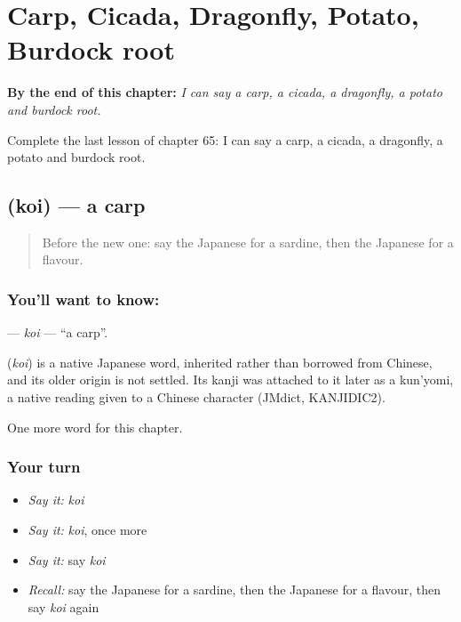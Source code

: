 
\chapter{Carp, Cicada, Dragonfly, Potato, Burdock root}
\label{ch:ja-carp-cicada-dragonfly-potato-burdock-root}

\begin{chapteropening}
\textbf{By the end of this chapter:} \emph{I can say a carp, a cicada, a dragonfly, a potato and burdock root.}

Complete the last lesson of chapter 65: I can say a carp, a cicada, a dragonfly, a potato and burdock root.
\end{chapteropening}

\section[\texorpdfstring{\ja{こい} (koi)}{こい (koi)}]{ (koi) — a carp}

\label{lesson:JA-C65-koi}



\begin{quote}
Before the new one: say the Japanese for a sardine, then the Japanese for a flavour.
\end{quote}

\subsection*{You'll want to know: }
\textbf{} — \emph{koi} — \textquotedblleft{}a carp\textquotedblright{}.

\begin{cousinweb}
\textbf{} (\emph{koi}) is a native Japanese word, inherited rather than borrowed from Chinese, and its older origin is not settled. Its kanji was attached to it later as a kun'yomi, a native reading given to a Chinese character (JMdict, KANJIDIC2).
\end{cousinweb}

\begin{grammarlens}[title={What you've built}]
One more word for this chapter.
\end{grammarlens}

\subsection*{Your turn}
\begin{itemize}
\raggedright
  \item \emph{Say it:} \emph{koi}
  \item \emph{Say it:} \emph{koi}, once more
  \item \emph{Say it:} say \emph{koi}
  \item \emph{Recall:} say the Japanese for a sardine, then the Japanese for a flavour, then say \emph{koi} again
\end{itemize}

